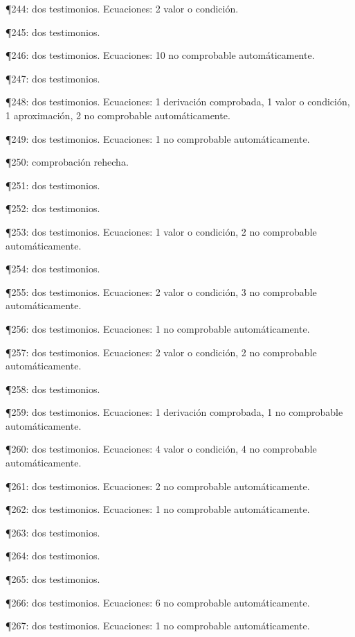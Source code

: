 \documentclass[10pt,openany]{book}
\begin{document}
\noindent ¶244: dos testimonios. Ecuaciones: 2 valor o condición.\par
\noindent ¶245: dos testimonios.\par
\noindent ¶246: dos testimonios. Ecuaciones: 10 no comprobable automáticamente.\par
\noindent ¶247: dos testimonios.\par
\noindent ¶248: dos testimonios. Ecuaciones: 1 derivación comprobada, 1 valor o condición, 1 aproximación, 2 no comprobable automáticamente.\par
\noindent ¶249: dos testimonios. Ecuaciones: 1 no comprobable automáticamente.\par
\noindent ¶250: comprobación rehecha.\par
\noindent ¶251: dos testimonios.\par
\noindent ¶252: dos testimonios.\par
\noindent ¶253: dos testimonios. Ecuaciones: 1 valor o condición, 2 no comprobable automáticamente.\par
\noindent ¶254: dos testimonios.\par
\noindent ¶255: dos testimonios. Ecuaciones: 2 valor o condición, 3 no comprobable automáticamente.\par
\noindent ¶256: dos testimonios. Ecuaciones: 1 no comprobable automáticamente.\par
\noindent ¶257: dos testimonios. Ecuaciones: 2 valor o condición, 2 no comprobable automáticamente.\par
\noindent ¶258: dos testimonios.\par
\noindent ¶259: dos testimonios. Ecuaciones: 1 derivación comprobada, 1 no comprobable automáticamente.\par
\noindent ¶260: dos testimonios. Ecuaciones: 4 valor o condición, 4 no comprobable automáticamente.\par
\noindent ¶261: dos testimonios. Ecuaciones: 2 no comprobable automáticamente.\par
\noindent ¶262: dos testimonios. Ecuaciones: 1 no comprobable automáticamente.\par
\noindent ¶263: dos testimonios.\par
\noindent ¶264: dos testimonios.\par
\noindent ¶265: dos testimonios.\par
\noindent ¶266: dos testimonios. Ecuaciones: 6 no comprobable automáticamente.\par
\noindent ¶267: dos testimonios. Ecuaciones: 1 no comprobable automáticamente.\par
\end{document}

